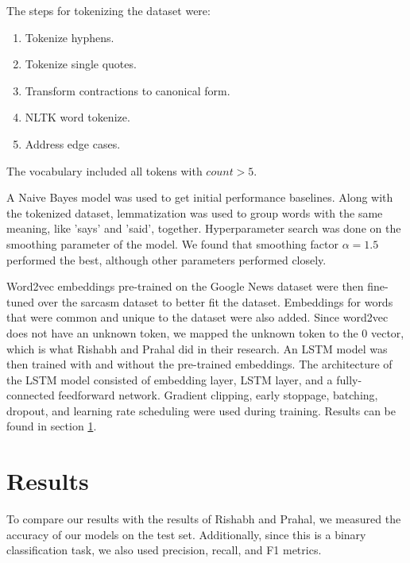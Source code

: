 \documentclass[11pt]{article}
\begin{document}
The steps for tokenizing the dataset were:
\begin{enumerate}
    \item Tokenize hyphens.
    \item Tokenize single quotes.
    \item Transform contractions to canonical form.
    \item NLTK word tokenize.
    \item Address edge cases.
\end{enumerate}
The vocabulary included all tokens with $ count > 5 $.

A Naive Bayes model was used to get initial performance baselines.
Along with the tokenized dataset,
lemmatization was used to group words with the same meaning,
like 'says' and 'said', together.
Hyperparameter search was done on the smoothing parameter of the model.
We found that smoothing factor $ \alpha = 1.5 $ performed the best,
although other parameters performed closely.

Word2vec embeddings pre-trained on the Google News dataset
were then fine-tuned over the sarcasm dataset to better fit the dataset. \cite{google-word2vec}
Embeddings for words that were common and unique to the dataset were also added.
Since word2vec does not have an unknown token,
we mapped the unknown token to the 0 vector,
which is what Rishabh and Prahal did in their research. \cite{misra2023Sarcasm}
An LSTM model was then trained with and without the pre-trained embeddings.
The architecture of the LSTM model consisted of
embedding layer, LSTM layer, and a fully-connected feedforward network.
Gradient clipping, early stoppage, batching, dropout,
and learning rate scheduling were used during training.
Results can be found in section \ref{sec:res}.


\section{Results}\label{sec:res}

To compare our results with the results of Rishabh and Prahal,
we measured the accuracy of our models on the test set. \cite{misra2023Sarcasm}
Additionally, since this is a binary classification task,
we also used precision, recall, and F1 metrics.

\end{document}

